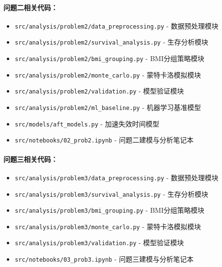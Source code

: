 \documentclass[withoutpreface]{cumcmthesis}
\begin{document}
\paragraph{问题二相关代码：}
\begin{itemize}
    \item \texttt{src/analysis/problem2/data\_preprocessing.py} - 数据预处理模块
    \item \texttt{src/analysis/problem2/survival\_analysis.py} - 生存分析模块
    \item \texttt{src/analysis/problem2/bmi\_grouping.py} - BMI分组策略模块
    \item \texttt{src/analysis/problem2/monte\_carlo.py} - 蒙特卡洛模拟模块
    \item \texttt{src/analysis/problem2/validation.py} - 模型验证模块
    \item \texttt{src/analysis/problem2/ml\_baseline.py} - 机器学习基准模型
    \item \texttt{src/models/aft\_models.py} - 加速失效时间模型
    \item \texttt{src/notebooks/02\_prob2.ipynb} - 问题二建模与分析笔记本
\end{itemize}

\paragraph{问题三相关代码：}
\begin{itemize}
    \item \texttt{src/analysis/problem3/data\_preprocessing.py} - 数据预处理模块
    \item \texttt{src/analysis/problem3/survival\_analysis.py} - 生存分析模块
    \item \texttt{src/analysis/problem3/bmi\_grouping.py} - BMI分组策略模块
    \item \texttt{src/analysis/problem3/monte\_carlo.py} - 蒙特卡洛模拟模块
    \item \texttt{src/analysis/problem3/validation.py} - 模型验证模块
    \item \texttt{src/notebooks/03\_prob3.ipynb} - 问题三建模与分析笔记本
\end{itemize}
\end{document}
